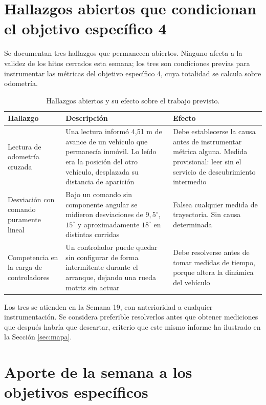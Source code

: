 \documentclass[12pt,letterpaper]{article}
\begin{document}
\section{Hallazgos abiertos que condicionan el objetivo específico 4}
\label{sec:abiertos}

Se documentan tres hallazgos que permanecen abiertos. Ninguno afecta a la validez de los hitos cerrados esta semana; los tres son condiciones previas para instrumentar las métricas del objetivo específico 4, cuya totalidad se calcula sobre odometría.

\begin{table}[H]
    \centering
    \small
    \caption{Hallazgos abiertos y su efecto sobre el trabajo previsto.}
    \label{tab:abiertos}
    \begin{tabular}{@{}p{4.5cm}p{4.5cm}p{4.3cm}@{}}
        \toprule
        \textbf{Hallazgo} & \textbf{Descripción} & \textbf{Efecto} \\ \midrule
        Lectura de odometría cruzada & Una lectura informó 4,51 m de avance de un vehículo que permanecía inmóvil. Lo leído era la posición del otro vehículo, desplazada su distancia de aparición & Debe establecerse la causa antes de instrumentar métrica alguna. Medida provisional: leer sin el servicio de descubrimiento intermedio \\ \addlinespace
        Desviación con comando puramente lineal & Bajo un comando sin componente angular se midieron desviaciones de $9{,}5^\circ$, $15^\circ$ y aproximadamente $18^\circ$ en distintas corridas & Falsea cualquier medida de trayectoria. Sin causa determinada \\ \addlinespace
        Competencia en la carga de controladores & Un controlador puede quedar sin configurar de forma intermitente durante el arranque, dejando una rueda motriz sin actuar & Debe resolverse antes de tomar medidas de tiempo, porque altera la dinámica del vehículo \\ \bottomrule
    \end{tabular}
\end{table}

Los tres se atienden en la Semana 19, con anterioridad a cualquier instrumentación. Se considera preferible resolverlos antes que obtener mediciones que después habría que descartar, criterio que este mismo informe ha ilustrado en la Sección \ref{sec:mapa}.

\section{Aporte de la semana a los objetivos específicos}
\label{sec:aporte}
\end{document}
